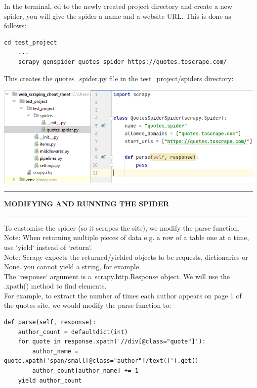 \documentclass[8pt]{extarticle}
\newcommand{\heading}[1]{%
    \noindent
    \rule{\linewidth}{0.4pt}
    \begin{center}
        \vspace{-1ex}
        \textbf{#1}        
        \vspace{-2.5ex}
    \end{center}
    \rule{\linewidth}{0.4pt}
}
\begin{document}
\begin{multicols}{3}
In the terminal, cd to the newly created project directory and create a new spider, you will give the spider a name and a website URL. This is done as follows:

\begin{lstlisting}[style=python]     
    cd test_project
    ...
    scrapy genspider quotes_spider https://quotes.toscrape.com/
\end{lstlisting}

\columnbreak
This creates the quotes\_spider.py file in the test\_project/spiders directory:
\begin{center}
    \includegraphics[width=\columnwidth]{images/created_spider.png}
\end{center}

\heading{MODIFYING AND RUNNING THE SPIDER}

To customise the spider (so it scrapes the site), we modify the parse function. \\

Note: When returning multiple pieces of data e.g. a row of a table one at a time, use `yield` instead of `return`. \\

Note: Scrapy expects the returned/yielded objects to be requests, dictionaries or None. you cannot yield a string, for example.\\

The `response` argument is a scrapy.http.Response object. We will use the .xpath() method to find elements. \\

For example, to extract the number of times each author appears on page 1 of the quotes site, we would modify the parse function to:

\begin{lstlisting}[style=python]     
def parse(self, response):
    author_count = defaultdict(int)
    for quote in response.xpath('//div[@class="quote"]'):
        author_name = quote.xpath('span/small[@class="author"]/text()').get()
        author_count[author_name] += 1
    yield author_count
\end{lstlisting}


\end{multicols}
\end{document}
